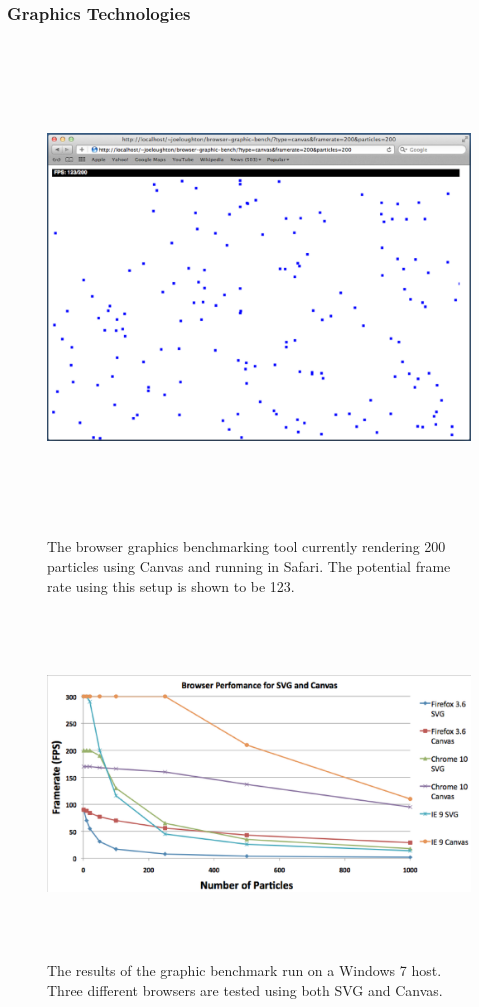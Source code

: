 \documentclass[11pt, a4paper]{article}
\begin{document}
\subsubsection{Graphics Technologies}

\begin{figure}
\centering
\includegraphics[width=170mm,height=130.08mm]{assets/benchmark-tool.eps}
\caption{The browser graphics benchmarking tool currently rendering 200
particles using Canvas and running in Safari. The potential frame rate using
this setup is shown to be 123.}
\label{fig:benchmark-tool}
\end{figure}

\begin{figure}
\centering
\includegraphics[width=170mm,height=91.67mm]{assets/benchmark-graph.eps}
\caption{The results of the graphic benchmark run on a Windows 7 host. Three
different browsers are tested using both SVG and Canvas.}
\label{fig:benchmark-graph}
\end{figure}
\end{document}

